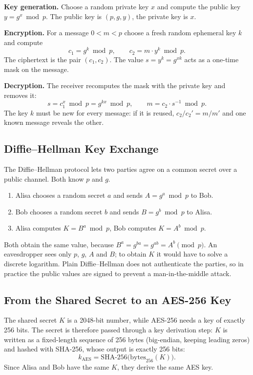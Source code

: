 \documentclass[12pt,a4paper]{article}
\begin{document}
\textbf{Key generation.} Choose a random private key $x$ and compute the public key $y = g^x \bmod p$. The public key is $(p, g, y)$, the private key is $x$.

\textbf{Encryption.} For a message $0 < m < p$ choose a fresh random ephemeral key $k$ and compute
\begin{equation}
  c_1 = g^k \bmod p, \qquad c_2 = m \cdot y^k \bmod p.
\end{equation}
The ciphertext is the pair $(c_1, c_2)$. The value $s = y^k = g^{xk}$ acts as a one-time mask on the message.

\textbf{Decryption.} The receiver recomputes the mask with the private key and removes it:
\begin{equation}
  s = c_1^x \bmod p = g^{kx} \bmod p, \qquad m = c_2 \cdot s^{-1} \bmod p.
\end{equation}
The key $k$ must be new for every message: if it is reused, $c_2/c_2' = m/m'$ and one known message reveals the other.

\subsection{Diffie--Hellman Key Exchange}

The Diffie--Hellman protocol lets two parties agree on a common secret over a public channel. Both know $p$ and $g$.
\begin{enumerate}
  \item Alisa chooses a random secret $a$ and sends $A = g^a \bmod p$ to Bob.
  \item Bob chooses a random secret $b$ and sends $B = g^b \bmod p$ to Alisa.
  \item Alisa computes $K = B^a \bmod p$, Bob computes $K = A^b \bmod p$.
\end{enumerate}
Both obtain the same value, because $B^a = g^{ba} = g^{ab} = A^b \pmod p$. An eavesdropper sees only $p$, $g$, $A$ and $B$; to obtain $K$ it would have to solve a discrete logarithm. Plain Diffie--Hellman does not authenticate the parties, so in practice the public values are signed to prevent a man-in-the-middle attack.

\subsection{From the Shared Secret to an AES-256 Key}

The shared secret $K$ is a 2048-bit number, while AES-256 needs a key of exactly 256 bits. The secret is therefore passed through a key derivation step: $K$ is written as a fixed-length sequence of 256 bytes (big-endian, keeping leading zeros) and hashed with SHA-256, whose output is exactly 256 bits:
\begin{equation}
  k_{\mathrm{AES}} = \mathrm{SHA\text{-}256}\bigl(\mathrm{bytes}_{256}(K)\bigr).
\end{equation}
Since Alisa and Bob have the same $K$, they derive the same AES key.
\end{document}
